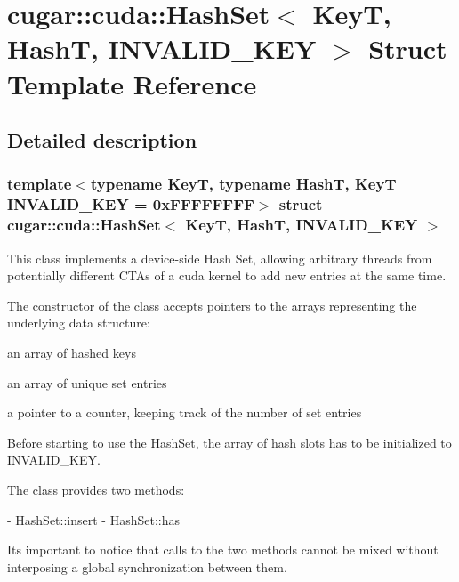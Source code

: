 \hypertarget{structcugar_1_1cuda_1_1_hash_set}{}\section{cugar\+:\+:cuda\+:\+:Hash\+Set$<$ KeyT, HashT, I\+N\+V\+A\+L\+I\+D\+\_\+\+K\+EY $>$ Struct Template Reference}
\label{structcugar_1_1cuda_1_1_hash_set}


\subsection{Detailed description}
\subsubsection*{template$<$typename KeyT, typename HashT, KeyT I\+N\+V\+A\+L\+I\+D\+\_\+\+K\+EY = 0x\+F\+F\+F\+F\+F\+F\+FF$>$\newline
struct cugar\+::cuda\+::\+Hash\+Set$<$ Key\+T, Hash\+T, I\+N\+V\+A\+L\+I\+D\+\_\+\+K\+E\+Y $>$}

This class implements a device-\/side Hash Set, allowing arbitrary threads from potentially different C\+T\+As of a cuda kernel to add new entries at the same time.

The constructor of the class accepts pointers to the arrays representing the underlying data structure\+:


\begin{DoxyItemize}
\item an array of hashed keys
\item an array of unique set entries
\item a pointer to a counter, keeping track of the number of set entries
\end{DoxyItemize}

Before starting to use the \hyperlink{structcugar_1_1cuda_1_1_hash_set}{Hash\+Set}, the array of hash slots has to be initialized to I\+N\+V\+A\+L\+I\+D\+\_\+\+K\+EY.

The class provides two methods\+: \begin{DoxyVerb}- HashSet::insert
- HashSet::has
\end{DoxyVerb}


It\textquotesingle{}s important to notice that calls to the two methods cannot be mixed without interposing a global synchronization between them. 

